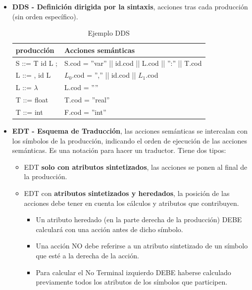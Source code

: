 \documentclass[12pt, twoside, openright]{report} %
\begin{document}
\begin{itemize}
  \item \textbf{DDS - Definición dirigida por la sintaxis}, acciones tras cada producción (sin orden específico).

  \begin{table}[H]
  \centering
  \begin{tabular}{|l|l|}
  \hline
  \textbf{producción} & \textbf{Acciones semánticas}                         \\ \hline
  S ::= T id L ;      & S.cod = ''var'' || id.cod || L.cod || '':'' || T.cod \\ \hline
  L ::= , id L        & $L_0$.cod = '','' || id.cod || $L_1$.cod             \\ \hline
  L ::= $\lambda$     & L.cod = ''''                                         \\ \hline
  T ::= float         & T.cod = ''real''                                     \\ \hline
  T ::= int           & F.cod = ''int''                                      \\ \hline
  \end{tabular}
  \caption{Ejemplo DDS}
  \end{table}

  \item \textbf{EDT - Esquema de Traducción}, las acciones semánticas se intercalan con los símbolos de la producción, indicando el orden de ejecución de las acciones semánticas. Es una notación para hacer un traductor. Tiene dos tipos:
  \begin{itemize}
    \item EDT \textbf{solo con atributos sintetizados}, las acciones se ponen al final de la producción.
    \item EDT con \textbf{atributos sintetizados y heredados}, la posición de las acciones debe tener en cuenta los cálculos y atributos que contribuyen.
    \begin{itemize}
      \item Un atributo heredado (en la parte derecha de la producción) DEBE calculará con una acción antes de dicho símbolo.
      \item Una acción NO debe referirse a un atributo sintetizado de un símbolo que esté a la derecha de la acción.
      \item Para calcular el No Terminal izquierdo DEBE haberse calculado previamente todos los atributos de los símbolos que participen.
    \end{itemize}
  \end{itemize}
\end{itemize}
\end{document}
